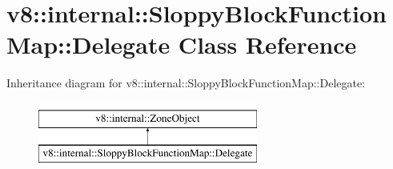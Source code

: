 \hypertarget{classv8_1_1internal_1_1SloppyBlockFunctionMap_1_1Delegate}{}\section{v8\+:\+:internal\+:\+:Sloppy\+Block\+Function\+Map\+:\+:Delegate Class Reference}
\label{classv8_1_1internal_1_1SloppyBlockFunctionMap_1_1Delegate}
Inheritance diagram for v8\+:\+:internal\+:\+:Sloppy\+Block\+Function\+Map\+:\+:Delegate\+:\begin{figure}[H]
\begin{center}
\leavevmode
\includegraphics[height=2.000000cm]{classv8_1_1internal_1_1SloppyBlockFunctionMap_1_1Delegate}
\end{center}
\end{figure}
